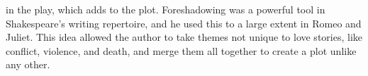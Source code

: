 \documentclass[12pt]{report}
\begin{document}
in the play, which adds to the plot. Foreshadowing was a powerful tool in Shakespeare's writing repertoire, and he used this to a large extent in Romeo and Juliet. This idea allowed the author to take themes not unique to love stories, like conflict, violence, and death, and merge them all together to create a plot unlike any other.
\end{document}
